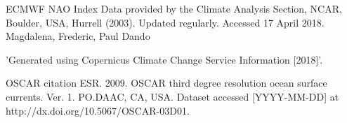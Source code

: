 %
%
%
%

%
%
%





%	
%	
%
%	


\acknowledgments
ECMWF
NAO Index Data provided by the Climate Analysis Section, NCAR, Boulder, USA, Hurrell (2003). Updated regularly. Accessed 17 April 2018.
Magdalena, Frederic, Paul Dando

'Generated using Copernicus Climate Change Service Information [2018]'.

OSCAR citation ESR. 2009. OSCAR third degree resolution ocean surface currents. Ver. 1. PO.DAAC,	CA,	USA. Dataset accessed [YYYY-MM-DD] at http://dx.doi.org/10.5067/OSCAR-03D01.

